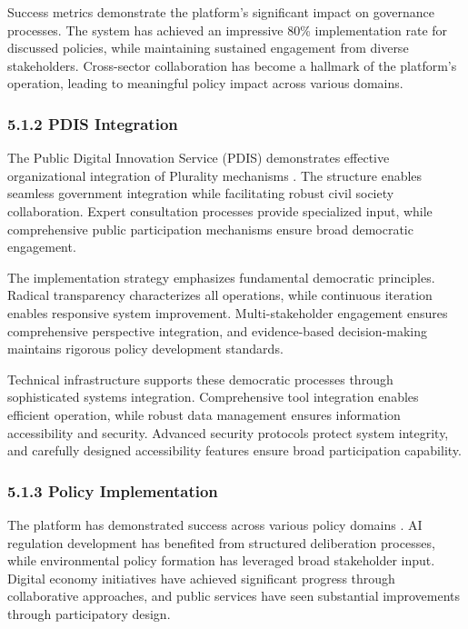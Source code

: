 Success metrics demonstrate the platform's significant impact on governance processes. The system has achieved an impressive 80\% implementation rate for discussed policies, while maintaining sustained engagement from diverse stakeholders. Cross-sector collaboration has become a hallmark of the platform's operation, leading to meaningful policy impact across various domains.

\hypertarget{pdis-integration}{%
\subsubsection{5.1.2 PDIS Integration}\label{pdis-integration}}

The Public Digital Innovation Service (PDIS) demonstrates effective organizational integration of Plurality mechanisms \citep{pdis2024}. The structure enables seamless government integration while facilitating robust civil society collaboration. Expert consultation processes provide specialized input, while comprehensive public participation mechanisms ensure broad democratic engagement.

The implementation strategy emphasizes fundamental democratic principles. Radical transparency characterizes all operations, while continuous iteration enables responsive system improvement. Multi-stakeholder engagement ensures comprehensive perspective integration, and evidence-based decision-making maintains rigorous policy development standards.

Technical infrastructure supports these democratic processes through sophisticated systems integration. Comprehensive tool integration enables efficient operation, while robust data management ensures information accessibility and security. Advanced security protocols protect system integrity, and carefully designed accessibility features ensure broad participation capability.

\hypertarget{policy-implementation}{%
\subsubsection{5.1.3 Policy Implementation}\label{policy-implementation}}

The platform has demonstrated success across various policy domains \citep{pdis2024}. AI regulation development has benefited from structured deliberation processes, while environmental policy formation has leveraged broad stakeholder input. Digital economy initiatives have achieved significant progress through collaborative approaches, and public services have seen substantial improvements through participatory design.


